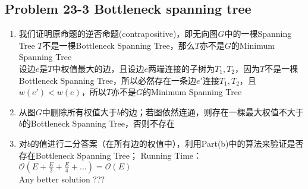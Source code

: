 \subsection*{Problem 23-3 Bottleneck spanning tree}
\begin{enumerate}
	\item	我们证明原命题的逆否命题(contrapositive)，即无向图$G$中的一棵Spanning Tree $T$不是一棵Bottleneck Spanning Tree，那么$T$亦不是$G$的Minimum Spanning Tree \\
		设边$e$是$T$中权值最大的边，且设边$e$两端连接的子树为$T_1, T_2$，因为$T$不是一棵Bottleneck Spanning Tree，所以必然存在一条边$e'$连接$T_1, T_2$，且$w(e') < w(e)$，所以$T$亦不是$G$的Minimum Spanning Tree
	\item	从图$G$中删除所有权值大于$b$的边；若图依然连通，则存在一棵最大权值不大于$b$的Bottleneck Spanning Tree，否则不存在
	\item	对$b$的值进行二分答案（在所有边的权值中），利用Part(b)中的算法来验证是否存在Bottleneck Spanning Tree； Running Time：$\mathcal{O}(E + \frac{E}{2}+ \frac{E}{4} + ...) = \mathcal{O}(E)$ \\
		Any better solution ???
		
\end{enumerate}

